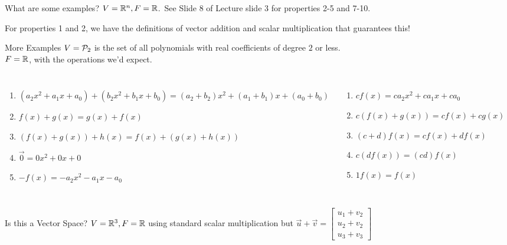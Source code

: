 \documentclass[xcoler=dvipsnames, aspectratio=169]{beamer}
\begin{document}
    \begin{frame}{What are some examples?}
        $V=\R^n, F = \R$.\pause\ See Slide 8 of Lecture slide 3 for properties 2-5 and 7-10.

        For properties 1 and 2, we have the definitions of vector addition and scalar multiplication that guarantees this!
        \vspace{130pt}
    \end{frame}
    \begin{frame}{More Examples}
        $V = \P_2$ is the set of all polynomials with real coefficients of degree $2$ or less.\pause\\
        $F = \R$, with the operations we'd expect.
        \begin{columns}
                \begin{enumerate}
                    \pause\item $(a_2x^2 + a_1x + a_0) + (b_2x^2 + b_1x + b_0) = 
                        (a_2 + b_2)x^2 + (a_1+b_1)x + (a_0 + b_0)$
                    \pause\item $f(x) + g(x) = g(x) + f(x)$
                    \pause\item $(f(x) + g(x)) + h(x) = f(x) + (g(x) + h(x))$
                    \pause\item $\vec{0} = 0x^2 + 0x + 0$
                    \pause\item $-f(x) = -a_2x^2 - a_1x - a_0$
                \end{enumerate}
                \begin{enumerate}\addtocounter{enumi}{5}
                    \pause\item $cf(x) = ca_2x^2 + ca_1x + ca_0$
                    \pause\item $c(f(x) + g(x)) = cf(x) + cg(x)$
                    \pause\item $(c+d)f(x) = cf(x) + df(x)$
                    \pause\item $c(df(x)) = (cd)f(x)$
                    \pause\item $1f(x) = f(x)$
                \end{enumerate}
        \end{columns}
    \end{frame}
    \begin{frame}{Is this a Vector Space?}
        $V = \R^3, F=\R$ using standard scalar multiplication but $\vec{u}+\vec{v} =\begin{bmatrix}
            u_1+v_2\\
            u_2+v_2\\
            u_3+v_3
        \end{bmatrix}$
        \vspace{130pt}
    \end{frame}
\end{document}
